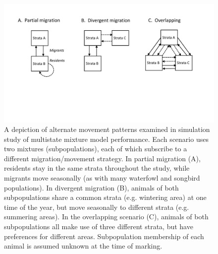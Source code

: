 \documentclass[times,mee,doublespace,]{besauth2}
\begin{document}
\pagebreak
\begin{figure}
\begin{center}
\includegraphics[width=170mm]{migration_diagrams.pdf}
\caption{A depiction of alternate movement patterns examined in simulation study of multistate mixture model performance. Each scenario uses two mixtures (subpopulations), each of which subscribe to a different migration/movement strategy.  In partial migration (A), residents stay in the same strata throughout the study, while migrants move seasonally (as with many waterfowl and songbird populations).  In divergent migration (B), animals of both subpopulations share a common strata (e.g. wintering area) at one time of the year, but move seasonally to different strata (e.g. summering areas).  In the overlapping scenario (C), animals of both subpopulations all make use of three different strata, but have preferences for different areas.   Subpopulation membership of each animal is assumed unknown at the time of marking.} \label{fig:migration}
\end{center}
\end{figure}
\end{document}
